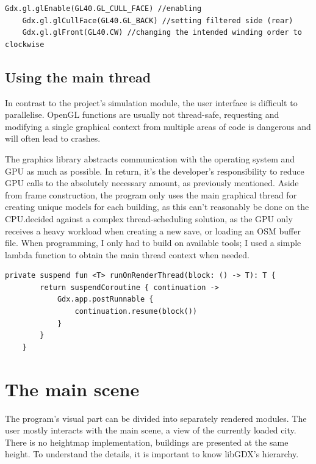 \begin{lstlisting}[caption=Example for changing OpenGL's culling properties through libGDX]
    Gdx.gl.glEnable(GL40.GL_CULL_FACE) //enabling
    Gdx.gl.glCullFace(GL40.GL_BACK) //setting filtered side (rear)
    Gdx.gl.glFront(GL40.CW) //changing the intended winding order to clockwise
\end{lstlisting}

\subsection{Using the main thread}

In contrast to the project's simulation module, the user interface is difficult to parallelise. OpenGL functions are usually not thread-safe, requesting and modifying a single graphical context from multiple areas of code is dangerous and will often lead to crashes.

The graphics library abstracts communication with the operating system and GPU as much as possible. In return, it's the developer's responsibility to reduce GPU calls to the absolutely necessary amount, as previously mentioned. Aside from frame construction, the program only uses the main graphical thread for creating unique models for each building, as this can't reasonably be done on the CPU.\@I decided against a complex thread-scheduling solution, as the GPU only receives a heavy workload when creating a new save, or loading an OSM buffer file. When programming, I only had to build on available tools; I used a simple lambda function to obtain the main thread context when needed.

\begin{lstlisting}[caption=Helper function for getting the draw thread]
private suspend fun <T> runOnRenderThread(block: () -> T): T {
        return suspendCoroutine { continuation ->
            Gdx.app.postRunnable {
                continuation.resume(block())
            }
        }
    }
\end{lstlisting}


\section{The main scene}
The program's visual part can be divided into separately rendered modules. The user mostly interacts with the main scene, a view of the currently loaded city. There is no heightmap implementation, buildings are presented at the same height. To understand the details, it is important to know libGDX's hierarchy.\cite{LibgdxModels}

